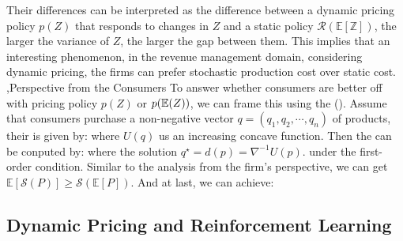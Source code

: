 \documentclass[12pt]{report}
\begin{document}
Their differences can be interpreted as the difference between a dynamic pricing policy $p(Z)$ that responds to changes in $Z$ and a static policy $\mathcal{R}(\mathbb{E}[\mathbb{Z}])$,
the larger the variance of $Z$, the larger the gap between them. This implies that an interesting phenomenon, in the revenue management domain, considering dynamic pricing, the firms can prefer 
stochastic production cost over static cost.
\sep{Perspective from the Consumers}
To answer whether consumers are better off with pricing policy $p(Z)$ or $p(\mathbb{E}(Z))$,
we can frame this using the  (\cite{chen2019welfare}).
Assume that consumers purchase a non-negative vector $q=(q_1,q_2,\cdots,q_n)$ of products, their  is given by:
where $U(q)$ us an increasing concave function. Then the  can be conputed by:
where the solution $q^{\star}=d(p)=\nabla^{-1}U(p)$. under the first-order condition. Similar to the analysis from the firm's
perspective, we can get $\mathbb{E}[\mathcal{S}(P)]\geq\mathcal{S}(\mathbb{E}[P])$.
And at last, we can achieve:

\subsection{Dynamic Pricing and Reinforcement Learning}
\end{document}
